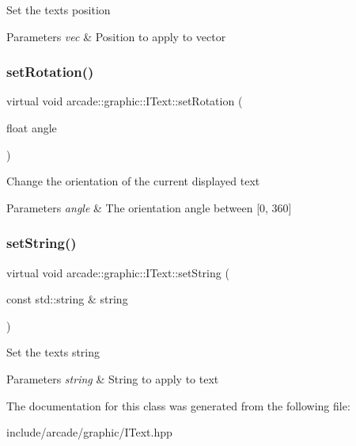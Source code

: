 Set the text\textquotesingle{}s position 
\begin{DoxyParams}{Parameters}
{\em vec} & Position to apply to vector \\
\hline
\end{DoxyParams}
\mbox{\label{classarcade_1_1graphic_1_1_i_text_ae0fe24a144225c000b6359ff4897f14a}} 
\subsubsection{\texorpdfstring{setRotation()}{setRotation()}}
{\footnotesize\ttfamily virtual void arcade\+::graphic\+::\+I\+Text\+::set\+Rotation (\begin{DoxyParamCaption}\item[{float}]{angle }\end{DoxyParamCaption})\hspace{0.3cm}{\ttfamily [pure virtual]}}

Change the orientation of the current displayed text 
\begin{DoxyParams}{Parameters}
{\em angle} & The orientation angle between \mbox{[}0, 360\mbox{]} \\
\hline
\end{DoxyParams}
\mbox{\label{classarcade_1_1graphic_1_1_i_text_a782961b4f818490d05fbffd439fb667e}} 
\subsubsection{\texorpdfstring{setString()}{setString()}}
{\footnotesize\ttfamily virtual void arcade\+::graphic\+::\+I\+Text\+::set\+String (\begin{DoxyParamCaption}\item[{const std\+::string \&}]{string }\end{DoxyParamCaption})\hspace{0.3cm}{\ttfamily [pure virtual]}}

Set the text\textquotesingle{}s string 
\begin{DoxyParams}{Parameters}
{\em string} & String to apply to text \\
\hline
\end{DoxyParams}


The documentation for this class was generated from the following file\+:\begin{DoxyCompactItemize}
\item 
include/arcade/graphic/I\+Text.\+hpp\end{DoxyCompactItemize}
